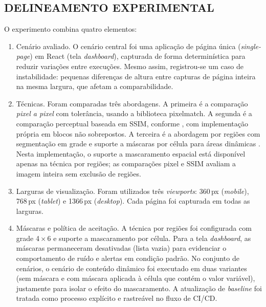 \documentclass{UNESC}
\begin{document}
\subsection{DELINEAMENTO EXPERIMENTAL}
O experimento combina quatro elementos:
\begin{enumerate}[label=\alph*),leftmargin=1.5em]
  \item Cenário avaliado. O cenário central foi uma aplicação de página única (\emph{single-page}) em React (tela \textit{dashboard}), capturada de forma determinística para reduzir variações entre execuções. Mesmo assim, registrou-se um caso de instabilidade: pequenas diferenças de altura entre capturas de página inteira na mesma largura, que afetam a comparabilidade.
  \item Técnicas. Foram comparadas três abordagens. A primeira é a comparação \emph{pixel a pixel} com tolerância, usando a biblioteca pixelmatch. A segunda é a comparação perceptual baseada em SSIM, conforme , com implementação própria em blocos não sobrepostos. A terceira é a abordagem por regiões com segmentação em grade e suporte a máscaras por célula para áreas dinâmicas \cite{tanno2020}. Nesta implementação, o suporte a mascaramento espacial está disponível apenas na técnica por regiões; as comparações pixel e SSIM avaliam a imagem inteira sem exclusão de regiões.
  \item Larguras de visualização. Foram utilizados três \emph{viewports}: 360\,px (\textit{mobile}), 768\,px (\textit{tablet}) e 1366\,px (\textit{desktop}). Cada página foi capturada em todas as larguras.
  \item Máscaras e política de aceitação. A técnica por regiões foi configurada com grade 4\,$\times$\,6 e suporte a mascaramento por célula. Para a tela \textit{dashboard}, as máscaras permaneceram desativadas (lista vazia) para evidenciar o comportamento de ruído e alertas em condição padrão. No conjunto de cenários, o cenário de conteúdo dinâmico foi executado em duas variantes (sem máscara e com máscara aplicada à célula que contém o valor variável), justamente para isolar o efeito do mascaramento. A atualização de \emph{baseline} foi tratada como processo explícito e rastreável no fluxo de CI/CD.
\end{enumerate}
\end{document}
